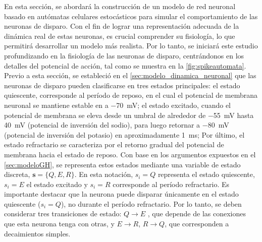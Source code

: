 En esta sección, se abordará la construcción de un modelo de red neuronal basado en autómatas celulares estocásticos para simular el comportamiento de las neuronas de disparo. Con el fin de lograr una representación adecuada de la dinámica real de estas neuronas, es crucial comprender  su fisiología, lo que permitirá desarrollar un modelo más realista. Por lo tanto, se iniciará este estudio profundizando en la fisiología de las neuronas de disparo, centrándonos en los detalles del potencial de acción, tal como se muestra en la \cref{fig:spikeautomata}.   Previo a esta sección, se estableció en el \cref{sec:modelo_dinamica_neuronal} que las neuronas de disparo pueden clasificarse en tres estados principales: el estado quiescente, corresponde al período de reposo, en el cual el potencial de membrana neuronal se mantiene estable en a \qty{-70}{\milli\volt}; el estado excitado, cuando el potencial de membrana se eleva desde un umbral de alrededor de \qty{-55}{\milli\volt} hasta \qty{40}{\milli\volt} (potencial de inversión del sodio), para luego retornar a  \qty{-80}{\milli\volt} (potencial de inversión del potasio) en aproximadamente  \qty{1}{\milli\second}; Por último, el estado refractario se caracteriza por el retorno gradual del potencial de membrana hacia el estado de reposo. Con base en los argumentos expuestos en el \cref{sec:modeloGH}, se representa estos estados mediante una variable de estado discreta,  $\mathbf{s} = \{Q, E, R\}$. En esta notación,  $s_i = Q$ representa el estado quiescente, $s_i = E$ el estado excitado y $s_i = R$ corresponde al período refractario. Es importante destacar que la neurona puede disparar únicamente en el estado quiescente ($s_i = Q$), no durante el período refractario. Por lo tanto, se deben considerar tres transiciones de estado: $Q\to E$ , que depende de las conexiones que esta neurona tenga con otras, y $E\to R$, $R\to Q$, que corresponden a decaimientos simples.



